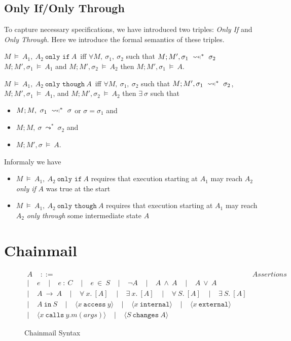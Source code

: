 \documentclass[acmsmall,review,anonymous]{acmart}\settopmatter{printfolios=true,printccs=false,printacmref=false}
\newcommand{\constrained}{\mathrel{\leadsto\ \!\!\!\!{\raisebox{1pt}{$\mathsmaller{\mathsmaller{\mathsmaller{\mathsmaller\rvert}}}$}}}}
\newcommand\onlyIf[3]{#1,\ #2\ \texttt{only if}\ #3}
\newcommand\onlyThrough[3]{#1,\ #2\ \texttt{only though}\ #3}
\newcommand\calls[4]{\langle #1\ \texttt{calls}\ #2.#3(#4) \rangle}
\newcommand\changes[2]{\langle #1\ \texttt{changes}\ #2 \rangle}
\newcommand\access[2]{\langle #1\ \texttt{access}\ #2 \rangle}
\newcommand\internal[1]{\langle #1\ \texttt{internal}\rangle}
\newcommand\external[1]{\langle #1\ \texttt{external}\rangle}
\begin{document}
\subsection{Only If/Only Through}
To capture necessary specifications, we have introduced two triples: \emph{Only If} and \emph{Only Through}.
Here we introduce the formal semantics of these triples.
\begin{definition}[Only If]
$M\ \vDash\ \onlyIf{A_1}{A_2}{A}$\ iff 
$\forall M,\ \sigma_1,\ \sigma_2$ such that 
$M; M', \sigma_1\ \constrained^*\ \sigma_2$
$M; M', \sigma_1\ \vDash\ A_1$ and 
$M; M', \sigma_2\ \vDash\ A_2$ then
$M; M', \sigma_1\ \vDash\ A$.
\end{definition}
\begin{definition}
$M\ \vDash\ \onlyThrough{A_1}{A_2}{A}$\ iff 
$\forall M,\ \sigma_1,\ \sigma_2$ such that 
$M; M', \sigma_1\ \constrained^*\ \sigma_2$, 
$M; M', \sigma_1\ \vDash\ A_1$, and 
$M; M', \sigma_2\ \vDash\ A_2$ then
$\exists\ \sigma$ such that 
\begin{itemize}
\item
$M; M,\ \sigma_1\ \constrained^*\ \sigma$ or $\sigma = \sigma_1$ and
\item
$M; M,\ \sigma\ \leadsto^*\ \sigma_2$ and 
\item
$M; M', \sigma\ \vDash\ A$.
\end{itemize}
\end{definition}
Informaly we have 
\begin{itemize}
\item
$M\ \vDash\ \onlyIf{A_1}{A_2}{A}$ requires that execution starting at $A_1$ may reach $A_2$ \emph{only if} $A$ was true at the start
\item
$M\ \vDash\ \onlyThrough{A_1}{A_2}{A}$ requires that execution starting at $A_1$ may reach $A_2$ \emph{only through} some intermediate state $A$
\end{itemize}

\section{Chainmail}
\begin{figure}[h]
\[
\begin{array}{lr}
A\;\;\;\; ::= & \textit{Assertions}\\  
|\;\;\;\; e                        \;\;\;\;  
|\;\;\;\; e\ :\ C                  \;\;\;\;
|\;\;\;\; e\ \in\ S                \;\;\;\;
|\;\;\;\; \neg A 					\;\;\;\;
|\;\;\;\; A\ \wedge\ A 			\;\;\;\;
|\;\;\;\; A\ \vee\ A \\
|\;\;\;\; A\ \longrightarrow\ A 	\;\;\;\;
|\;\;\;\; \forall\ x.\ [A] 		\;\;\;\;
|\;\;\;\; \exists\ x.\ [A] 		\;\;\;\;
|\;\;\;\; \forall\ S.\ [A] 		\;\;\;\;
|\;\;\;\; \exists\ S.\ [A] 		\\
|\;\;\;\; A\ \texttt{in}\ S        \;\;\;\; 
|\;\;\;\; \access{x}{y}            \;\;\;\;
|\;\;\;\; \internal{x}             \;\;\;\; 
|\;\;\;\; \external{x}             \\
|\;\;\;\; \calls{x}{y}{m}{args} 	\;\;\;\;
|\;\;\;\; \changes{S}{A} 			
\end{array}
\]
\caption{Chainmail Syntax}
\label{f:chainmail_assertions}
\end{figure}
\end{document}

